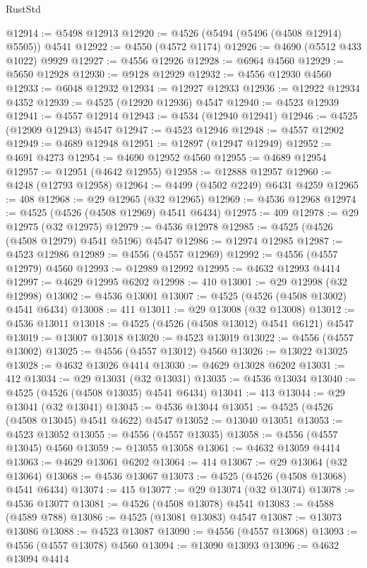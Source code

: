 \begin{lexlean}{RustStd}
\begin{coremodule}
{\begin{coremodule}
{{{{{{{{{{{{{{{{{{{{{{{{{{{{{{{{{{{{{{{{{{{{{{{{{{{{{{{@12914 := @5498 @12913
@12920 := @4526 (@5494 (@5496 (@4508 @12914) @5505)) @4541
@12922 := @4550 (@4572 @1174)
@12926 := @4690 (@5512 @433 @1022) @9929
@12927 := @4556 @12926
@12928 := @6964 @4560
@12929 := @5650 @12928
@12930 := @9128 @12929
@12932 := @4556 @12930 @4560
@12933 := @6048 @12932
@12934 := @12927 @12933
@12936 := @12922 @12934 @4352
@12939 := @4525 (@12920 @12936) @4547
@12940 := @4523 @12939
@12941 := @4557 @12914
@12943 := @4534 (@12940 @12941)
@12946 := @4525 (@12909 @12943) @4547
@12947 := @4523 @12946
@12948 := @4557 @12902
@12949 := @4689 @12948
@12951 := @12897 (@12947 @12949)
@12952 := @4691 @4273
@12954 := @4690 @12952 @4560
@12955 := @4689 @12954
@12957 := @12951 (@4642 @12955)
@12958 := @12888 @12957
@12960 := @4248 (@12793 @12958)
@12964 := @4499 (@4502 @2249) @6431 @4259
@12965 := 408
@12968 := @29 @12965 (@32 @12965)
@12969 := @4536 @12968
@12974 := @4525 (@4526 (@4508 @12969) @4541 @6434)
@12975 := 409
@12978 := @29 @12975 (@32 @12975)
@12979 := @4536 @12978
@12985 := @4525 (@4526 (@4508 @12979) @4541 @5196) @4547
@12986 := @12974 @12985
@12987 := @4523 @12986
@12989 := @4556 (@4557 @12969)
@12992 := @4556 (@4557 @12979) @4560
@12993 := @12989 @12992
@12995 := @4632 @12993 @4414
@12997 := @4629 @12995 @6202
@12998 := 410
@13001 := @29 @12998 (@32 @12998)
@13002 := @4536 @13001
@13007 := @4525 (@4526 (@4508 @13002) @4541 @6434)
@13008 := 411
@13011 := @29 @13008 (@32 @13008)
@13012 := @4536 @13011
@13018 := @4525 (@4526 (@4508 @13012) @4541 @6121) @4547
@13019 := @13007 @13018
@13020 := @4523 @13019
@13022 := @4556 (@4557 @13002)
@13025 := @4556 (@4557 @13012) @4560
@13026 := @13022 @13025
@13028 := @4632 @13026 @4414
@13030 := @4629 @13028 @6202
@13031 := 412
@13034 := @29 @13031 (@32 @13031)
@13035 := @4536 @13034
@13040 := @4525 (@4526 (@4508 @13035) @4541 @6434)
@13041 := 413
@13044 := @29 @13041 (@32 @13041)
@13045 := @4536 @13044
@13051 := @4525 (@4526 (@4508 @13045) @4541 @4622) @4547
@13052 := @13040 @13051
@13053 := @4523 @13052
@13055 := @4556 (@4557 @13035)
@13058 := @4556 (@4557 @13045) @4560
@13059 := @13055 @13058
@13061 := @4632 @13059 @4414
@13063 := @4629 @13061 @6202
@13064 := 414
@13067 := @29 @13064 (@32 @13064)
@13068 := @4536 @13067
@13073 := @4525 (@4526 (@4508 @13068) @4541 @6434)
@13074 := 415
@13077 := @29 @13074 (@32 @13074)
@13078 := @4536 @13077
@13081 := @4526 (@4508 @13078) @4541
@13083 := @4588 (@4589 @788)
@13086 := @4525 (@13081 @13083) @4547
@13087 := @13073 @13086
@13088 := @4523 @13087
@13090 := @4556 (@4557 @13068)
@13093 := @4556 (@4557 @13078) @4560
@13094 := @13090 @13093
@13096 := @4632 @13094 @4414
}}}}}}}}}}}}}}}}}}}}}}}}}}}}}}}}}}}}}}}}}}}}}}}}}}}}}}}
\end{coremodule}}
\end{coremodule}
\end{lexlean}
